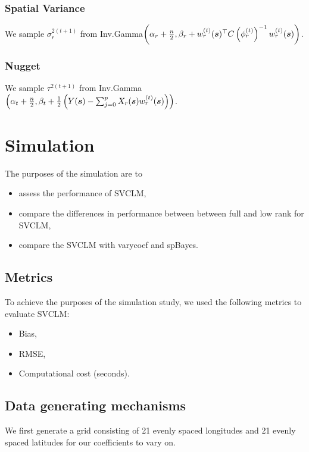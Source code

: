 \subsubsection{Spatial Variance}
\label{sec:spatial_variance}

We sample $\sigma_r^{2(t+1)}$ from Inv.Gamma$\left(\alpha_r + \frac{n}{2}, \beta_r + w_r^{(t)}(\boldsymbol{s})^{\top} C\left(\phi_r^{(t)}\right)^{-1} w_r^{(t)}(\boldsymbol{s})\right)$.

\subsubsection{Nugget}
\label{sec:nugget}

We sample $\tau^{2(t+1)}$ from Inv.Gamma$\left(\alpha_t + \frac{n}{2}, \beta_t + \frac{1}{2} \left(Y(\boldsymbol{s}) - \sum_{j=0}^p X_r(\boldsymbol{s})w_r^{(t)}(\boldsymbol{s}) \right)\right)$.

\section{Simulation}
\label{sec:simulation}
The purposes of the simulation are to 
\begin{itemize}
    \item assess the performance of SVCLM,
    \item compare the differences in performance between between full and low rank for SVCLM,
    \item compare the SVCLM with varycoef and spBayes.
\end{itemize}

\subsection{Metrics}
To achieve the purposes of the simulation study, we used the following metrics to evaluate SVCLM:
\begin{itemize}
    \item Bias,
    \item RMSE,
    \item Computational cost (seconds).
\end{itemize}

\subsection{Data generating mechanisms}
We first generate a grid consisting of 21 evenly spaced longitudes and 21 evenly spaced latitudes for our coefficients to vary on.


